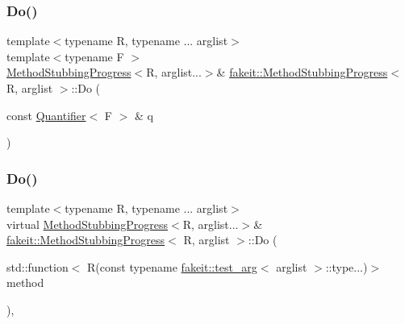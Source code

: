 \mbox{\label{structfakeit_1_1MethodStubbingProgress_a59f9d7ab7c86b809ce25b41d05b58ad2}} 
\subsubsection{\texorpdfstring{Do()}{Do()}\hspace{0.1cm}{\footnotesize\ttfamily [5/27]}}
{\footnotesize\ttfamily template$<$typename R, typename ... arglist$>$ \\
template$<$typename F $>$ \\
\mbox{\hyperlink{structfakeit_1_1MethodStubbingProgress}{Method\+Stubbing\+Progress}}$<$R, arglist...$>$\& \mbox{\hyperlink{structfakeit_1_1MethodStubbingProgress}{fakeit\+::\+Method\+Stubbing\+Progress}}$<$ R, arglist $>$\+::Do (\begin{DoxyParamCaption}\item[{const \mbox{\hyperlink{structfakeit_1_1Quantifier}{Quantifier}}$<$ F $>$ \&}]{q }\end{DoxyParamCaption})\hspace{0.3cm}{\ttfamily [inline]}}

\mbox{\label{structfakeit_1_1MethodStubbingProgress_a9ef4c2db8e567aa312b708613d240ae1}} 
\subsubsection{\texorpdfstring{Do()}{Do()}\hspace{0.1cm}{\footnotesize\ttfamily [6/27]}}
{\footnotesize\ttfamily template$<$typename R, typename ... arglist$>$ \\
virtual \mbox{\hyperlink{structfakeit_1_1MethodStubbingProgress}{Method\+Stubbing\+Progress}}$<$R, arglist...$>$\& \mbox{\hyperlink{structfakeit_1_1MethodStubbingProgress}{fakeit\+::\+Method\+Stubbing\+Progress}}$<$ R, arglist $>$\+::Do (\begin{DoxyParamCaption}\item[{std\+::function$<$ R(const typename \mbox{\hyperlink{structfakeit_1_1test__arg}{fakeit\+::test\+\_\+arg}}$<$ arglist $>$\+::type...)$>$}]{method }\end{DoxyParamCaption})\hspace{0.3cm}{\ttfamily [inline]}, {\ttfamily [virtual]}}

